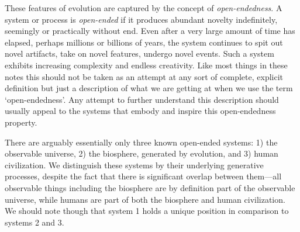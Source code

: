 \documentclass[12pt,letterpaper]{article}
\begin{document}
These features of evolution are captured by the concept of {\em open-endedness}. A system or process is {\em open-ended} if it produces abundant novelty indefinitely, seemingly or practically without end. Even after a very large amount of time has elapsed, perhaps millions or billions of years, the system continues to spit out novel artifacts, take on novel features, undergo novel events. Such a system exhibits increasing complexity and endless creativity. Like most things in these notes this should not be taken as an attempt at any sort of complete, explicit definition but just a description of what we are getting at when we use the term `open-endedness'. Any attempt to further understand this description should usually appeal to the systems that embody and inspire this open-endedness property.


There are arguably essentially only three known open-ended systems: 1) the observable universe, 2) the biosphere, generated by evolution, and 3) human civilization. We distinguish these systems by their underlying generative processes, despite the fact that there is significant overlap between them---all observable things including the biosphere are by definition part of the observable universe, while humans are part of both the biosphere and human civilization. We should note though that system 1 holds a unique position in comparison to systems 2 and 3.
\end{document}
